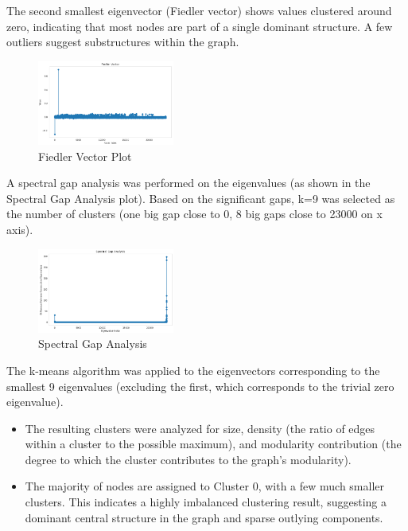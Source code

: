 \documentclass[conference]{IEEEtran}
\begin{document}
The second smallest eigenvector (Fiedler vector) shows values clustered around zero, indicating that most nodes are part of a single dominant structure. A few outliers suggest substructures within the graph. 

\begin{figure}[H]
    \centerline{\includegraphics[width=0.4\textwidth]{img/fiedler_vector_plot.png}}
    \centering
    \caption{Fiedler Vector Plot}
    \label{fig:fiedler_vector}
\end{figure}

A spectral gap analysis was performed on the eigenvalues (as shown in the Spectral Gap Analysis plot). Based on the significant gaps, k=9 was selected as the number of clusters (one big gap close to 0, 8 big gaps close to 23000 on x axis).

\begin{figure}[H]
    \centerline{\includegraphics[width=0.4\textwidth]{img/spectral_gap_analysis.png}}
    \centering
    \caption{Spectral Gap Analysis}
    \label{fig:spectral_gap}
\end{figure}

The k-means algorithm was applied to the eigenvectors corresponding to the smallest 9 eigenvalues (excluding the first, which corresponds to the trivial zero eigenvalue).

\begin{itemize}
    \item The resulting clusters were analyzed for size, density (the ratio of edges within a cluster to the possible maximum), and modularity contribution (the degree to which the cluster contributes to the graph's modularity).
    \item The majority of nodes are assigned to Cluster 0, with a few much smaller clusters. This indicates a highly imbalanced clustering result, suggesting a dominant central structure in the graph and sparse outlying components.
\end{itemize}
\end{document}
